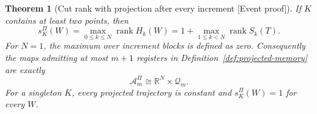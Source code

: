 \documentclass[11pt]{article}
\newcommand{\supportlabel}[1]{\textcolor{blue!60!black}{\small\textsf{[#1]}}}
\newcommand{\eventproof}{\supportlabel{Event proof}}
\numberwithin{equation}{section}
\newtheorem{theorem}{Theorem}[section]
\theoremstyle{definition}
\newcommand{\R}{\mathbb R}
\newcommand{\A}{\mathcal A}
\newcommand{\Q}{\mathcal Q}
\DeclareMathOperator{\rank}{rank}
\begin{document}
\begin{samepage}
\begin{theorem}[Cut rank with projection after every increment \eventproof]\label{thm:projected-rank}
If $K$ contains at least two points, then
\begin{equation}
 s_K^\Pi(W)=\max_{0\le k\le N}\rank H_k(W)
 =1+\max_{1\le k<N}\rank S_k(T).
 \label{eq:projected-rank}
\end{equation}
For $N=1$, the maximum over increment blocks is defined as zero. Consequently the maps admitting at most $m+1$ registers in Definition~\ref{def:projected-memory} are exactly
\[
 \A_m^\Pi\cong\R^N\times\Q_m.
\]
For a singleton $K$, every projected trajectory is constant and $s_K^\Pi(W)=1$ for every $W$.
\end{theorem}
\end{samepage}
\end{document}

